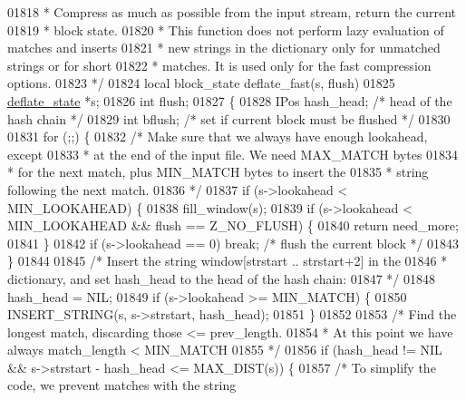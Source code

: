 \begin{DoxyCode}
{{{{{01818 \textcolor{comment}{ * Compress as much as possible from the input stream, return the current}
01819 \textcolor{comment}{ * block state.}
01820 \textcolor{comment}{ * This function does not perform lazy evaluation of matches and inserts}
01821 \textcolor{comment}{ * new strings in the dictionary only for unmatched strings or for short}
01822 \textcolor{comment}{ * matches. It is used only for the fast compression options.}
01823 \textcolor{comment}{ */}
01824 local block\_state deflate\_fast(s, flush)
01825     \hyperlink{structinternal__state}{deflate\_state} *s;
01826     \textcolor{keywordtype}{int} flush;
01827 \{
01828     IPos hash\_head;       \textcolor{comment}{/* head of the hash chain */}
01829     \textcolor{keywordtype}{int} bflush;           \textcolor{comment}{/* set if current block must be flushed */}
01830 
01831     \textcolor{keywordflow}{for} (;;) \{
01832         \textcolor{comment}{/* Make sure that we always have enough lookahead, except}
01833 \textcolor{comment}{         * at the end of the input file. We need MAX\_MATCH bytes}
01834 \textcolor{comment}{         * for the next match, plus MIN\_MATCH bytes to insert the}
01835 \textcolor{comment}{         * string following the next match.}
01836 \textcolor{comment}{         */}
01837         \textcolor{keywordflow}{if} (s->lookahead < MIN\_LOOKAHEAD) \{
01838             fill\_window(s);
01839             \textcolor{keywordflow}{if} (s->lookahead < MIN\_LOOKAHEAD && flush == Z\_NO\_FLUSH) \{
01840                 \textcolor{keywordflow}{return} need\_more;
01841             \}
01842             \textcolor{keywordflow}{if} (s->lookahead == 0) \textcolor{keywordflow}{break}; \textcolor{comment}{/* flush the current block */}
01843         \}
01844 
01845         \textcolor{comment}{/* Insert the string window[strstart .. strstart+2] in the}
01846 \textcolor{comment}{         * dictionary, and set hash\_head to the head of the hash chain:}
01847 \textcolor{comment}{         */}
01848         hash\_head = NIL;
01849         \textcolor{keywordflow}{if} (s->lookahead >= MIN\_MATCH) \{
01850             INSERT\_STRING(s, s->strstart, hash\_head);
01851         \}
01852 
01853         \textcolor{comment}{/* Find the longest match, discarding those <= prev\_length.}
01854 \textcolor{comment}{         * At this point we have always match\_length < MIN\_MATCH}
01855 \textcolor{comment}{         */}
01856         \textcolor{keywordflow}{if} (hash\_head != NIL && s->strstart - hash\_head <= MAX\_DIST(s)) \{
01857             \textcolor{comment}{/* To simplify the code, we prevent matches with the string}
}}}}}
\end{DoxyCode}

